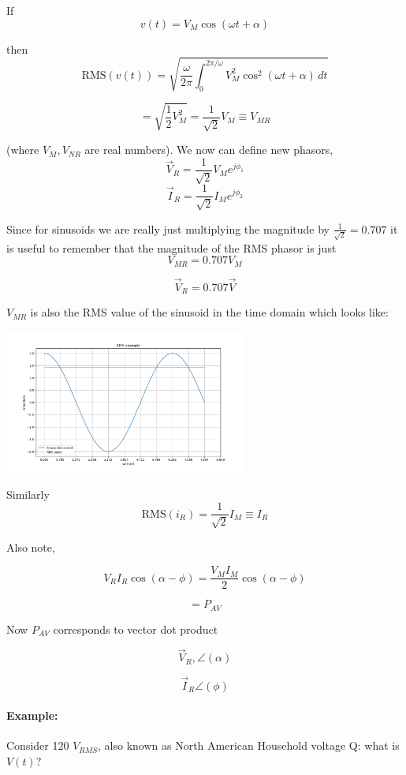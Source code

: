 If
\[
v(t) = V_M \cos(\omega t + \alpha)
\]

then
\[
\text{RMS}(v(t)) = \sqrt{\frac{\omega}{2\pi} \int_0^{2\pi/\omega} V_M^2 \cos^2(\omega t + \alpha) \, dt}
\]


\[
=\sqrt{ \frac{1}{2} V_M^2 }
= \frac{1}{\sqrt{2}} V_M \equiv V_{MR}
\]

(where $V_M, V_{NR}$ are real numbers).
We now can  define new phasors,
\[
\vec V_R = \frac {1}  {\sqrt{2}}  V_M e^{j\phi_1}
\]
\[
\vec I_R = \frac {1}  {\sqrt{2}}  I_M e^{j\phi_2}
\]

Since for sinusoids we are really just multiplying the magnitude by $\frac {1}  {\sqrt{2}} = 0.707$ it is useful to remember
that  the magnitude of the RMS phasor is just
\[
V_{MR} = 0.707 V_M
\]

\[
\vec V_R = 0.707 \vec V
\]

$V_{MR}$ is also the RMS value of the sinusoid in the time domain
which looks like:

\includegraphics[width=80mm]{figsChapt03/FP56580.png}


Similarly
\[
\text{RMS}(i_R) = \frac{1}{\sqrt{2}} I_M \equiv I_R
\]

\noindent Also note,

\[
V_R I_R \cos(\alpha - \phi) = \frac{V_M I_M}{2} \cos(\alpha - \phi)
\]

\[
= P_{AV}
\]



\noindent Now $P_{AV}$ corresponds to vector dot product


\[
\vec{V}_R, \angle(\alpha)
\]

\[
\vec{I}_R \angle(\phi)
\]


\paragraph{Example:}  Consider
120 $V_{RMS}$, also known as North American Household voltage
\vspace{0.25in}
\noindent Q: what is $V(t)$?
\vspace{0.25in}

